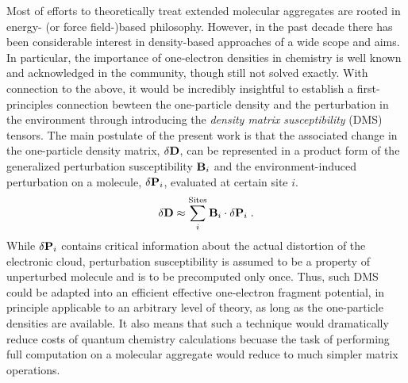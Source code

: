 \documentclass[aip,amsmath,amssymb,reprint,floatfix]{revtex4-1}
\newcommand{\BM}[1]{\bm{#1}}
\begin{document}
Most of efforts to theoretically treat extended molecular aggregates are rooted in 
energy\hyp{} (or force field\hyp{})based philosophy. However,
in the past decade there has been considerable interest in density\hyp{}based approaches
of a wide scope and aims.\cite{Piquemal.Cisneros.Reinhardt.Gresh.Darden.JCP.2006,
Mandado.Hermida-Ramon.JCTC.2011,
Sun.Chan.ACR.2016,
Hedegard.Reiher.JCTC.2016} 
In particular, the importance of
one\hyp{}electron densities in chemistry is well known and acknowledged in the community,
though still not solved exactly.\cite{Holas.March.PhysRevA.1991}
With connection to the above, it would be incredibly insightful 
to establish a first\hyp{}principles connection bewteen the one\hyp{}particle
density and the perturbation in the environment through introducing the
\emph{density matrix susceptibility} (DMS) tensors. %
The main postulate of the present work is that the associated change 
in the one\hyp{}particle density matrix, $\delta {\bf D}$, can be
represented in a product form of the generalized perturbation susceptibility ${\bf B}_i$
and the environment\hyp{}induced perturbation on a molecule, $\delta {\bf P}_i$,
evaluated at certain site $i$.
%
\begin{equation*} \label{e:initial-model}
  \delta {\bf D} \approx \sum_i^{\text{Sites}} {\bf B}_i
  \cdot  \delta {\bf P}_i \;.
\end{equation*}
%
While $\delta {\bf P}_i$ contains critical information 
about the actual distortion of the electronic cloud,
perturbation susceptibility is assumed to be a property of unperturbed 
molecule and is to be precomputed only once. 
Thus, such DMS could be adapted into an efficient effective 
one\hyp{}electron fragment potential, in principle applicable to an arbitrary
level of theory, as long as the one\hyp{}particle densities are available.
It also means that such a technique would dramatically reduce costs of quantum chemistry calculations
becuase the task of performing full computation on a molecular aggregate
would reduce to much simpler matrix operations.
%
\end{document}
